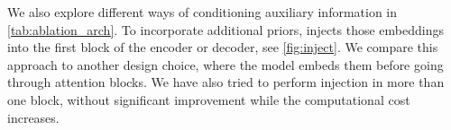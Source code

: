 

We also explore different ways of conditioning auxiliary information in \cref{tab:ablation_arch}.
To incorporate additional priors, \ours{} injects those embeddings into the first block of the encoder or decoder, see \cref{fig:inject}.
We compare this approach to another design choice, where the model embeds them before going through attention blocks.
We have also tried to perform injection in more than one block, without significant improvement while the computational cost increases.


